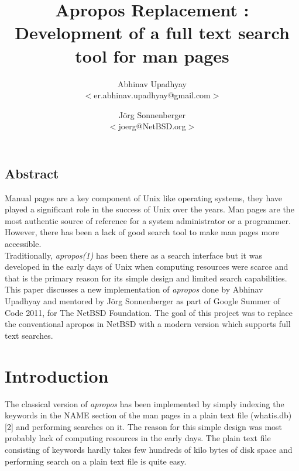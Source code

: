 \documentclass[letterpaper,twocolumn,10pt]{article}
\begin{document}
\date{}

\title{\Large \bf Apropos Replacement : Development of a full text search tool for man pages}

\author{
{\rm Abhinav Upadhyay}\\
$<$er.abhinav.upadhyay@gmail.com$>$
\and
{\rm J\"org Sonnenberger}\\
$<$joerg@NetBSD.org$>$
} %

\maketitle

\thispagestyle{empty}

\subsection*{Abstract}
Manual pages are a key component of Unix like operating systems, they have
played a significant role in the success of Unix over the years. Man pages are
the most authentic source of reference for a system administrator or a
programmer. However, there has been a lack of good search tool to make
man pages more accessible. \\

Traditionally, \textit{apropos(1)} has been there as a search interface but it
was developed in the early days of Unix when computing resources were scarce
and that is the primary reason for its simple design and limited search
capabilities. \\

This paper discusses a new implementation of \textit{apropos} done by
Abhinav Upadhyay and mentored by J\"org Sonnenberger as part of
Google Summer of Code 2011, for The NetBSD Foundation. The goal of this project
was to replace the
conventional apropos in NetBSD with a modern version which supports full text
searches. \\


\section{Introduction}
The classical version of \textit{apropos} has been implemented by simply
indexing the keywords in the NAME section of the man pages in a plain text file
(whatis.db) [2]
and performing searches on it. The reason for this simple design was most
probably lack of computing resources in the early days. The plain text file
consisting of keywords hardly takes few hundreds of kilo bytes of disk space
and performing search on a plain text file is quite easy. \\
\end{document}
